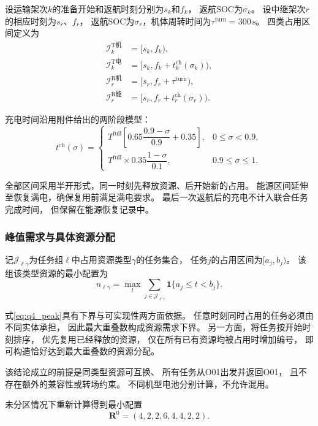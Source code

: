 \documentclass[bwprint]{gmcmthesis}
\begin{document}
设运输架次$k$的准备开始和返航时刻分别为$s_k$和$f_k$，
返航SOC为$\sigma_k$。
设中继架次$r$的相应时刻为$s_r$、$f_r$，
返航SOC为$\sigma_r$，机体周转时间为$\tau^{\mathrm{turn}}=300\,\mathrm{s}$。
四类占用区间定义为
\begin{align}
\mathcal{I}^{\mathrm{T机}}_k
&=[s_k,f_k),\\
\mathcal{I}^{\mathrm{T电}}_k
&=[s_k,f_k+t^{\mathrm{ch}}_k(\sigma_k)),\\
\mathcal{I}^{\mathrm{R机}}_r
&=[s_r,f_r+\tau^{\mathrm{turn}}),\\
\mathcal{I}^{\mathrm{R能}}_r
&=[s_r,f_r+t^{\mathrm{ch}}_r(\sigma_r)).
\end{align}

充电时间沿用附件给出的两阶段模型：
\begin{equation}
t^{\mathrm{ch}}(\sigma)=
\begin{cases}
T^{\mathrm{full}}
\left[
0.65\dfrac{0.9-\sigma}{0.9}+0.35
\right],
&0\leq \sigma<0.9,\\[2mm]
T^{\mathrm{full}}\times0.35
\dfrac{1-\sigma}{0.1},
&0.9\leq \sigma\leq1.
\end{cases}
\end{equation}

全部区间采用半开形式，同一时刻先释放资源、后开始新的占用。
能源区间延伸至恢复满电，确保复用前满足满电要求。
最后一次返航后的充电不计入联合任务完成时间，
但保留在能源恢复记录中。

\subsubsection{峰值需求与具体资源分配}

记$\mathcal{J}_{\ell\gamma}$为任务组$\ell$中占用资源类型$\gamma$的任务集合，
任务$j$的占用区间为$[a_j,b_j)$。
该组该类型资源的最小配置为
\begin{equation}
n_{\ell\gamma}
=
\max_t
\sum_{j\in\mathcal{J}_{\ell\gamma}}
\mathbf{1}\{a_j\leq t<b_j\}.
\label{eq:q4_peak}
\end{equation}

式\eqref{eq:q4_peak}具有下界与可实现性两方面依据。
任意时刻同时占用的任务必须由不同实体承担，
因此最大重叠数构成资源需求下界。
另一方面，将任务按开始时刻排序，
优先复用已经释放的资源，
仅在所有已有资源均被占用时增加编号，
即可构造恰好达到最大重叠数的资源分配。

该结论成立的前提是同类型资源可互换、
所有任务从O01出发并返回O01，
且不存在额外的兼容性或转场约束。
不同机型电池分别计算，不允许混用。

未分区情况下重新计算得到最小配置
\begin{equation}
\boldsymbol{R}^{0}=(4,2,2,6,4,4,2,2).
\end{equation}
\end{document}
